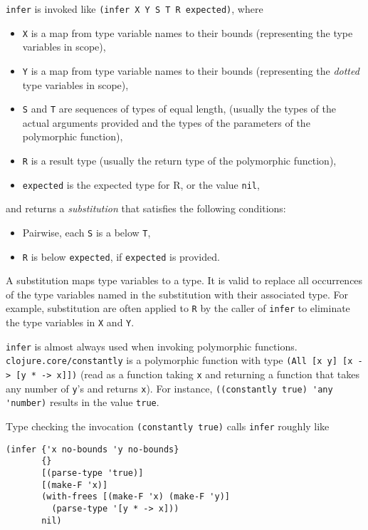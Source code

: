 \lstinline|infer| is invoked like \lstinline|(infer X Y S T R expected)|, where

\begin{itemize}
  \item \lstinline|X| is a map from type variable names
        to their bounds (representing the type variables in scope),
  \item \lstinline|Y| is a map from type variable names
        to their bounds (representing the \emph{dotted} type variables in scope),
  \item \lstinline|S| and \lstinline|T| are sequences of types of equal length,
        (usually the types of the actual arguments provided and the types of the parameters
        of the polymorphic function),
  \item \lstinline|R| is a result type (usually the return type of the polymorphic function),
  \item \lstinline|expected| is the expected type for R, or the value \lstinline|nil|,
\end{itemize}

and returns a \emph{substitution} that satisfies the following conditions:

\begin{itemize}
  \item Pairwise, each \lstinline|S| is a below \lstinline|T|,
  \item \lstinline|R| is below \lstinline|expected|, if \lstinline|expected| is provided.
\end{itemize}

A substitution maps type variables to a type.
It is valid to replace all occurrences of the type variables named in the substitution 
with their associated type.
For example, substitution are often applied to \lstinline|R| by the caller of \lstinline|infer|
to eliminate the type variables in \lstinline|X| and \lstinline|Y|.

\lstinline|infer| is almost always used when invoking polymorphic functions.
\lstinline|clojure.core/constantly| is a polymorphic function with type \lstinline|(All [x y] [x -> [y * -> x]])|
(read as a function taking \lstinline|x| and returning a function that takes any number
of \lstinline|y|'s and returns \lstinline|x|).
For instance, \lstinline|((constantly true) 'any 'number)| results in the value \lstinline|true|.

Type checking the invocation \lstinline|(constantly true)|
calls \lstinline|infer| roughly like

\begin{lstlisting}
(infer {'x no-bounds 'y no-bounds}
       {}
       [(parse-type 'true)]
       [(make-F 'x)]
       (with-frees [(make-F 'x) (make-F 'y)]
         (parse-type '[y * -> x]))
       nil)
\end{lstlisting}

